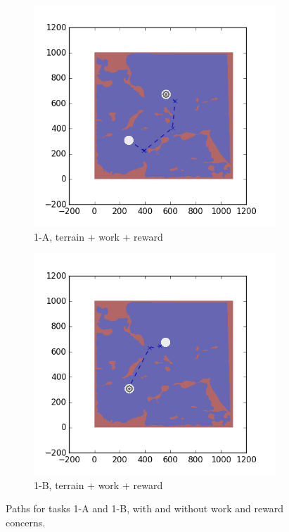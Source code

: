 \documentclass{tamuccthesis}
\begin{document}
\begin{figure}[H]
  \begin{subfigure}[b]{0.35\textwidth}
        \centering
        \includegraphics[width=\textwidth,trim={3cm 3cm 3cm 3cm},clip]{EXP3RG_PathAa_-1_-1_-1_-1.png}
        \caption{{\small1-A, terrain + work + reward}}
        \label{fig:Path_1-A_terrain_work_reward}
    \end{subfigure}
    \hfill
    \begin{subfigure}[b]{0.35\textwidth}  
        \centering 
        \includegraphics[width=\textwidth,trim={3cm 3cm 3cm 3cm},clip]{EXP3RG_PathAb_-1_-1_-1_-1.png}
        \caption{{\small1-B, terrain + work + reward}}
        \label{fig:Path_5-B_terrain_work_reward}
    \end{subfigure}
      
    \caption{Paths for tasks 1-A and 1-B, with and without work and reward concerns.}
    \label{fig:Paths_1-A_1-B}
\end{figure}
\end{document}
